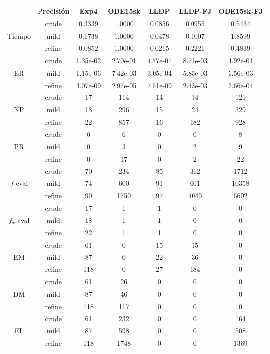 \begin{table}[htb]
\centering
\begin{tabular}{ |c|c|c|c|c|c|c| }
\hline
 & Precisi\'on & Exp4 & ODE15sk & LLDP & LLDP-FJ & ODE15sk-FJ \\
\hline
  & crude & 0.3339 & 1.0000 & 0.0856 & 0.0955 & 0.5434 \\
 Tiempo  & mild & 0.1738 & 1.0000 & 0.0478 & 0.1007 & 1.8599 \\
  & refine & 0.0852 & 1.0000 & 0.0215 & 0.2221 & 0.4839 \\
\hline
  & crude & 1.35e-02 & 2.70e-01 & 4.77e-01 & 8.71e-03 & 1.92e-01 \\
 ER  & mild & 1.15e-06 & 7.42e-03 & 3.05e-04 & 5.85e-03 & 3.56e-03 \\
  & refine & 4.07e-09 & 2.97e-05 & 7.51e-09 & 2.43e-03 & 3.66e-04 \\
\hline
  & crude & 17 & 114 & 14 & 14 & 121 \\
 NP  & mild & 18 & 296 & 15 & 24 & 329 \\
  & refine & 22 & 857 & 16 & 182 & 928 \\
\hline
  & crude & 0 & 6 & 0 & 0 & 8 \\
 PR  & mild & 0 & 3 & 0 & 2 & 9 \\
  & refine & 0 & 17 & 0 & 2 & 22 \\
\hline
  & crude & 70 & 234 & 85 & 312 & 1712 \\
 $f$-eval  & mild & 74 & 600 & 91 & 601 & 10358 \\
  & refine & 90 & 1750 & 97 & 4049 & 6602 \\
\hline
  & crude & 17 & 1 & 1 & 0 & 0 \\
 $f_x$-eval  & mild & 18 & 1 & 1 & 0 & 0 \\
  & refine & 22 & 1 & 1 & 0 & 0 \\
\hline
  & crude & 61 & 0 & 15 & 15 & 0 \\
 EM  & mild & 87 & 0 & 22 & 36 & 0 \\
  & refine & 118 & 0 & 27 & 184 & 0 \\
\hline
  & crude & 61 & 26 & 0 & 0 & 0 \\
 DM  & mild & 87 & 46 & 0 & 0 & 0 \\
  & refine & 118 & 117 & 0 & 0 & 0 \\
\hline
  & crude & 61 & 232 & 0 & 0 & 164 \\
 EL  & mild & 87 & 598 & 0 & 0 & 508 \\
  & refine & 118 & 1748 & 0 & 0 & 1369 \\

\end{tabular}
\end{table}
